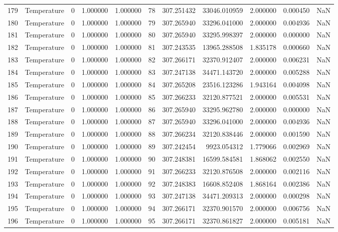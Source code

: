 \begin{tabular}{llrrrrrrrrr}
179 & Temperature & 0 & 1.000000 & 1.000000 & 78 & 307.251432 & 33046.010959 & 2.000000 & 0.000450 & NaN \\
180 & Temperature & 0 & 1.000000 & 1.000000 & 79 & 307.265940 & 33296.041000 & 2.000000 & 0.004936 & NaN \\
181 & Temperature & 0 & 1.000000 & 1.000000 & 80 & 307.265940 & 33295.998397 & 2.000000 & 0.000000 & NaN \\
182 & Temperature & 0 & 1.000000 & 1.000000 & 81 & 307.243535 & 13965.288508 & 1.835178 & 0.000660 & NaN \\
183 & Temperature & 0 & 1.000000 & 1.000000 & 82 & 307.266171 & 32370.912407 & 2.000000 & 0.006231 & NaN \\
184 & Temperature & 0 & 1.000000 & 1.000000 & 83 & 307.247138 & 34471.143720 & 2.000000 & 0.005288 & NaN \\
185 & Temperature & 0 & 1.000000 & 1.000000 & 84 & 307.265208 & 23516.123286 & 1.943164 & 0.004098 & NaN \\
186 & Temperature & 0 & 1.000000 & 1.000000 & 85 & 307.266233 & 32120.877521 & 2.000000 & 0.005531 & NaN \\
187 & Temperature & 0 & 1.000000 & 1.000000 & 86 & 307.265940 & 33295.962780 & 2.000000 & 0.000000 & NaN \\
188 & Temperature & 0 & 1.000000 & 1.000000 & 87 & 307.265940 & 33296.041000 & 2.000000 & 0.004936 & NaN \\
189 & Temperature & 0 & 1.000000 & 1.000000 & 88 & 307.266234 & 32120.838446 & 2.000000 & 0.001590 & NaN \\
190 & Temperature & 0 & 1.000000 & 1.000000 & 89 & 307.242454 & 9923.054312 & 1.779066 & 0.002969 & NaN \\
191 & Temperature & 0 & 1.000000 & 1.000000 & 90 & 307.248381 & 16599.584581 & 1.868062 & 0.002550 & NaN \\
192 & Temperature & 0 & 1.000000 & 1.000000 & 91 & 307.266233 & 32120.876508 & 2.000000 & 0.002116 & NaN \\
193 & Temperature & 0 & 1.000000 & 1.000000 & 92 & 307.248383 & 16608.852408 & 1.868164 & 0.002386 & NaN \\
194 & Temperature & 0 & 1.000000 & 1.000000 & 93 & 307.247138 & 34471.209313 & 2.000000 & 0.000298 & NaN \\
195 & Temperature & 0 & 1.000000 & 1.000000 & 94 & 307.266171 & 32370.901570 & 2.000000 & 0.006756 & NaN \\
196 & Temperature & 0 & 1.000000 & 1.000000 & 95 & 307.266171 & 32370.861827 & 2.000000 & 0.005181 & NaN \\

\end{tabular}
